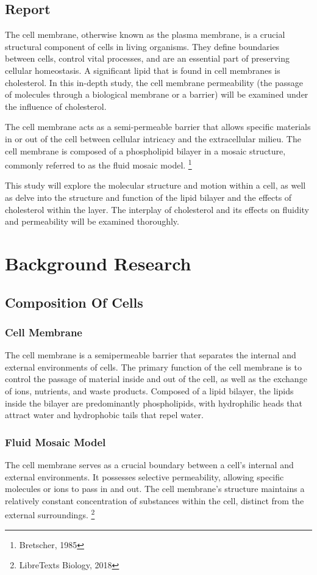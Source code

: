 \documentclass[a4paper,12pt,twoside,english]{all-in-one} %
\begin{document}
\subsection{Report}
The cell membrane, otherwise known as the plasma membrane, is a crucial structural component of cells in living organisms. They define boundaries between cells, control vital processes, and are an essential part of preserving cellular homeostasis. A significant lipid that is found in cell membranes is cholesterol. In this in-depth study, the cell membrane permeability (the passage of molecules through a biological membrane or a barrier) will be examined under the influence of cholesterol.  

The cell membrane acts as a semi-permeable barrier that allows specific materials in or out of the cell between cellular intricacy and the extracellular milieu. The cell membrane is composed of a phospholipid bilayer in a mosaic structure, commonly referred to as the fluid mosaic model. \footnote{Bretscher, 1985}

This study will explore the molecular structure and motion within a cell, as well as delve into the structure and function of the lipid bilayer and the effects of cholesterol within the layer. The interplay of cholesterol and its effects on fluidity and permeability will be examined thoroughly.

\section{Background Research}
\subsection{Composition Of Cells}
\subsubsection{Cell Membrane}
The cell membrane is a semipermeable barrier that separates the internal and external environments of cells. The primary function of the cell membrane is to control the passage of material inside and out of the cell, as well as the exchange of ions, nutrients, and waste products. Composed of a lipid bilayer, the lipids inside the bilayer are predominantly phospholipids, with hydrophilic heads that attract water and hydrophobic tails that repel water.

\subsubsection{Fluid Mosaic Model}
The cell membrane serves as a crucial boundary between a cell's internal and external environments. It possesses selective permeability, allowing specific molecules or ions to pass in and out. The cell membrane’s structure maintains a relatively constant concentration of substances within the cell, distinct from the external surroundings. \footnote{LibreTexts Biology, 2018} 
\end{document}
